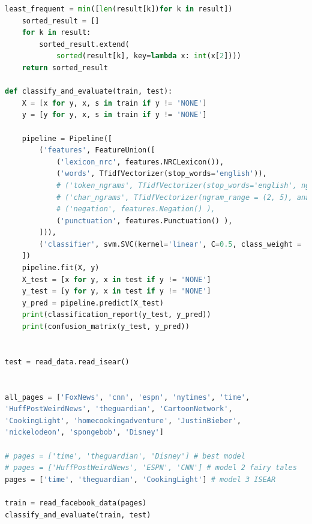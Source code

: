 \documentclass[
10pt, %
a4paper, %
oneside, %
headinclude,footinclude, %
BCOR5mm, %
]{scrartcl}
\begin{document}
\begin{lstlisting}[language=Python]
    least_frequent = min([len(result[k])for k in result])
    sorted_result = []
    for k in result:
        sorted_result.extend(
            sorted(result[k], key=lambda x: int(x[2])))
    return sorted_result

def classify_and_evaluate(train, test):
    X = [x for y, x, s in train if y != 'NONE']
    y = [y for y, x, s in train if y != 'NONE']

    pipeline = Pipeline([
        ('features', FeatureUnion([
            ('lexicon_nrc', features.NRCLexicon()),
            ('words', TfidfVectorizer(stop_words='english')),
            # ('token_ngrams', TfidfVectorizer(stop_words='english', ngram_range = (2, 5))),
            # ('char_ngrams', TfidfVectorizer(ngram_range = (2, 5), analyzer = 'char')),
            # ('negation', features.Negation() ),  
            ('punctuation', features.Punctuation() ),  
        ])),
        ('classifier', svm.SVC(kernel='linear', C=0.5, class_weight = 'balanced'))
    ])
    pipeline.fit(X, y)
    X_test = [x for y, x in test if y != 'NONE']
    y_test = [y for y, x in test if y != 'NONE']
    y_pred = pipeline.predict(X_test)
    print(classification_report(y_test, y_pred))
    print(confusion_matrix(y_test, y_pred))


test = read_data.read_isear()


all_pages = ['FoxNews', 'cnn', 'espn', 'nytimes', 'time',
'HuffPostWeirdNews', 'theguardian', 'CartoonNetwork',
'CookingLight', 'homecookingadventure', 'JustinBieber',
'nickelodeon', 'spongebob', 'Disney']

# pages = ['time', 'theguardian', 'Disney'] # best model
# pages = ['HuffPostWeirdNews', 'ESPN', 'CNN'] # model 2 fairy tales
pages = ['time', 'theguardian', 'CookingLight'] # model 3 ISEAR

train = read_facebook_data(pages)
classify_and_evaluate(train, test)
\end{lstlisting}
\clearpage
\end{document}
